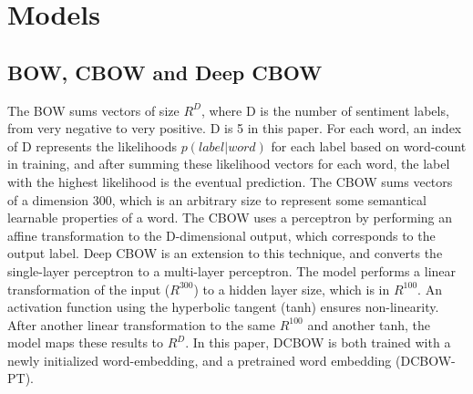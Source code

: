 \vspace{-5pt}
\section{Models}
\label{sec: models}
\vspace{-5pt}
\subsection{BOW, CBOW and Deep CBOW}
The BOW sums vectors of size $R^{D}$, where D is the number of sentiment labels,
from very negative to very positive. D is 5 in this paper. For each word, an
index of D represents the likelihoods $p(label|word)$ for each label based on
word-count in training, and after summing these likelihood vectors for each
word, the label with the highest likelihood is the eventual prediction. The CBOW
sums vectors of a dimension 300, which is an arbitrary size to represent some
semantical learnable properties of a word. The CBOW uses a perceptron by
performing an affine transformation to the D-dimensional output, which
corresponds to the output label. Deep CBOW is an extension to this technique,
and converts the single-layer perceptron to a multi-layer perceptron. The model
performs a linear transformation of the input ($R^{300}$) to a hidden layer
size, which is in $R^{100}$. An activation function using the hyperbolic tangent
(tanh) ensures non-linearity. After another linear transformation to the same
$R^{100}$ and another tanh, the model maps these results to $R^D$. In this
paper, DCBOW is both trained with a newly initialized word-embedding, and a
pretrained word embedding (DCBOW-PT).
\vspace{-5pt}
